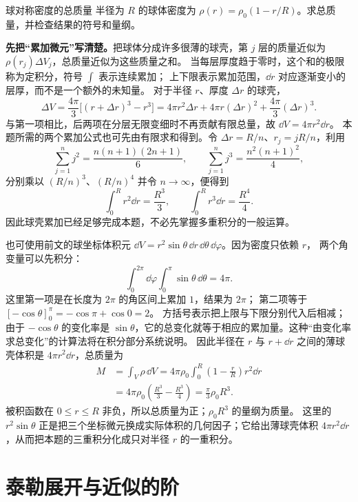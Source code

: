 \begin{origexamplebox}{球对称密度的总质量}
半径为 $R$ 的球体密度为 $\rho(r)=\rho_0(1-r/R)$。求总质量，并检查结果的符号和量纲。
\end{origexamplebox}
\begin{xesolution}
\textbf{先把“累加微元”写清楚。}把球体分成许多很薄的球壳，第 $j$ 层的质量近似为
$\rho(r_j)\Delta V_j$，总质量近似为这些质量之和。
当每层厚度趋于零时，这个和的极限称为定积分，符号 $\int$ 表示连续累加；
上下限表示累加范围，$\dd r$ 对应逐渐变小的层厚，而不是一个额外的未知量。
对于半径 $r$、厚度 $\Delta r$ 的球壳，
\[
 \Delta V=\frac{4\pi}{3}\bigl[(r+\Delta r)^3-r^3\bigr]
 =4\pi r^2\Delta r+4\pi r(\Delta r)^2+\frac{4\pi}{3}(\Delta r)^3.
\]
与第一项相比，后两项在分层无限变细时不再贡献有限总量，故 $\dd V=4\pi r^2\dd r$。
本题所需的两个累加公式也可先由有限求和得到。令 $\Delta r=R/n$、$r_j=jR/n$，利用
\[
 \sum_{j=1}^n j^2=\frac{n(n+1)(2n+1)}6,\qquad
 \sum_{j=1}^n j^3=\frac{n^2(n+1)^2}4,
\]
分别乘以 $(R/n)^3$、$(R/n)^4$ 并令 $n\to\infty$，便得到
\[
 \int_0^R r^2\dd r=\frac{R^3}{3},\qquad
 \int_0^R r^3\dd r=\frac{R^4}{4}.
\]
因此球壳累加已经足够完成本题，不必先掌握多重积分的一般运算。

也可使用前文的球坐标体积元
$\dd V=r^2\sin\theta\,\dd r\,\dd\theta\,\dd\varphi$。因为密度只依赖 $r$，
两个角变量可以先积分：
\[
 \int_0^{2\pi}\!\dd\varphi
 \int_0^\pi\!\sin\theta\,\dd\theta=4\pi.
\]
这里第一项是在长度为 $2\pi$ 的角区间上累加 $1$，结果为 $2\pi$；
第二项等于 $[-\cos\theta]_0^\pi=-\cos\pi+\cos0=2$。
方括号表示把上限与下限分别代入后相减；由于 $-\cos\theta$ 的变化率是
$\sin\theta$，它的总变化就等于相应的累加量。这种“由变化率求总变化”的计算法将在积分部分系统说明。
因此半径在 $r$ 与 $r+\dd r$ 之间的薄球壳体积是 $4\pi r^2\dd r$，总质量为
\begin{align*}
 M&=\int_V\rho\,\dd V
 =4\pi\rho_0\int_0^R\left(1-\frac rR\right)r^2\dd r\\
 &=4\pi\rho_0\left(\frac{R^3}{3}-\frac{R^3}{4}\right)
 =\boxed{\frac{\pi}{3}\rho_0R^3}.
\end{align*}
被积函数在 $0\le r\le R$ 非负，所以总质量为正；$\rho_0R^3$ 的量纲为质量。
这里的 $r^2\sin\theta$ 正是把三个坐标微元换成实际体积的几何因子；它给出薄球壳体积
$4\pi r^2\dd r$，从而把本题的三重积分化成只对半径 $r$ 的一重积分。
\end{xesolution}

\section{泰勒展开与近似的阶}

